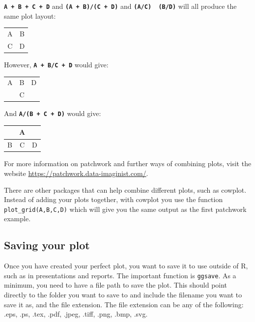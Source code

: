 \documentclass[
]{book}
\newcounter{none} %
\begin{document}
\textbf{\texttt{A\ +\ B\ +\ C\ +\ D}} and \textbf{\texttt{(A\ +\ B)/(C\ +\ D)}} and \textbf{\texttt{(A/C)\ \textbar{}\ (B/D)}} will all produce the same plot layout:

{\def\LTcaptype{none} %
\begin{longtable}[]{@{}cc@{}}
\toprule\noalign{}
\endhead
\bottomrule\noalign{}
\endlastfoot
A & B \\
C & D \\
\end{longtable}
}

However, \textbf{\texttt{A\ +\ B/C\ +\ D}} would give:

{\def\LTcaptype{none} %
\begin{longtable}[]{@{}ccc@{}}
\toprule\noalign{}
\endhead
\bottomrule\noalign{}
\endlastfoot
A & B & D \\
& C & \\
\end{longtable}
}

And \textbf{\texttt{A/(B\ +\ C\ +\ D)}} would give:

{\def\LTcaptype{none} %
\begin{longtable}[]{@{}ccc@{}}
\toprule\noalign{}
& A & \\
\midrule\noalign{}
\endhead
\bottomrule\noalign{}
\endlastfoot
B & C & D \\
\end{longtable}
}

For more information on patchwork and further ways of combining plots, visit the website \url{https://patchwork.data-imaginist.com/}.

There are other packages that can help combine different plots, such as cowplot. Instead of adding your plots together, with cowplot you use the function \texttt{plot\_grid(A,B,C,D)} which will give you the same output as the first patchwork example.

\subsection{Saving your plot}\label{saving-your-plot}

Once you have created your perfect plot, you want to save it to use outside of R, such as in presentations and reports. The important function is \texttt{ggsave}. As a minimum, you need to have a file path to save the plot. This should point directly to the folder you want to save to and include the filename you want to save it as, and the file extension. The file extension can be any of the following: .eps, .ps, .tex, .pdf, .jpeg, .tiff, .png, .bmp, .svg.
\end{document}
